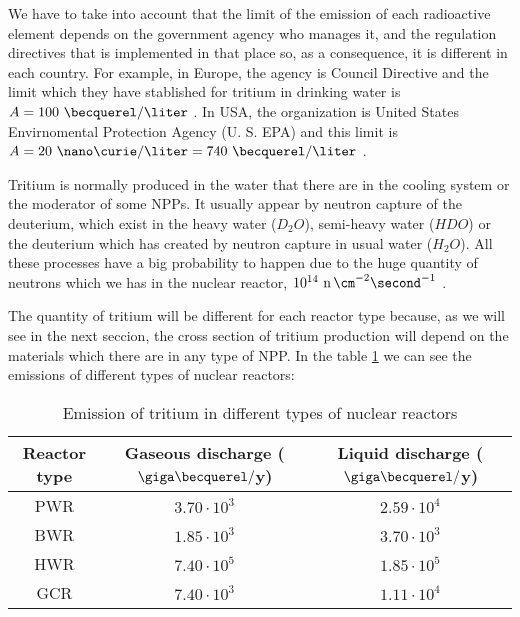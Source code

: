 We have to take into account that the limit of the emission of each radioactive element depends on the government agency who manages it, and the regulation directives that is implemented in that place so, as a consequence, it is different in each country. For example, in Europe, the agency is Council Directive and the limit which they have stablished for tritium in drinking water is $A = 100~\becquerel/\liter$ \cite{100BqL}. In USA, the organization is United States Envirnomental Protection Agency (U. S. EPA) and this limit is $A = 20~\nano\curie/\liter = 740~\becquerel/\liter$ \cite{740BqL}.

Tritium is normally produced in the water that there are in the cooling system or the moderator of some NPPs. It usually appear by neutron capture of the deuterium, which exist in the heavy water ($D_2 O$), semi-heavy water ($H D O$) or the deuterium which has created by neutron capture in usual water ($H_2 O$). All these processes have a big probability to happen due to the huge quantity of neutrons which we has in the nuclear reactor, $10^{14} ~\ce{n} \, \cm^{-2} \second^{-1}$ \cite{CrossSeccionNeutrons}. 

The quantity of tritium will be different for each reactor type because, as we will see in the next seccion, the cross section of tritium production will depend on the materials which there are in any type of NPP. In the table \ref{tab:TritiumEmisionsNPPs} we can see the emissions of different types of nuclear reactors:

\begin{table}[htbp]
\begin{center}
\begin{tabular}{|c|c|c|}
\hline
Reactor type & Gaseous discharge ($\giga\becquerel/$y) & Liquid discharge ($\giga\becquerel/$y) \\
\hline \hline \hline
PWR & $3.70\cdot 10^{3}$ & $2.59\cdot 10^{4}$ \\ \hline
BWR & $1.85\cdot 10^{3}$ & $3.70\cdot 10^{3}$ \\ \hline
HWR & $7.40\cdot 10^{5}$ & $1.85\cdot 10^{5}$ \\ \hline
GCR & $7.40\cdot 10^{3}$ & $1.11\cdot 10^{4}$ \\ \hline
\end{tabular}
\caption{Emission of tritium in different types of nuclear reactors\cite{CommonEmissionTritium}}
\label{tab:TritiumEmisionsNPPs}
\end{center}
\end{table} 

